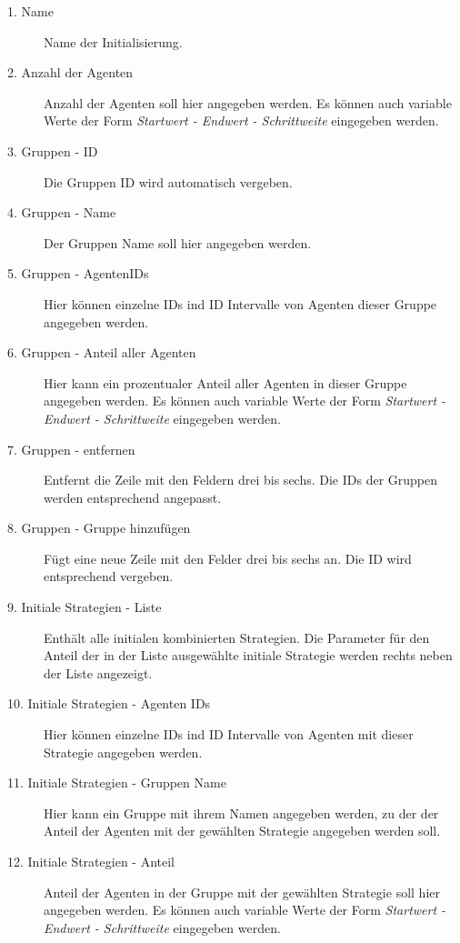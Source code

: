 \begin{description}


\item[1. Name] Name der Initialisierung.

\item[2. Anzahl der Agenten] Anzahl der Agenten soll hier angegeben werden. Es können auch variable Werte der Form \textit{Startwert - Endwert - Schrittweite} eingegeben werden.

\item[3. Gruppen - ID] Die Gruppen ID wird automatisch vergeben.

\item[4. Gruppen - Name] Der Gruppen Name soll hier angegeben werden.

\item[5. Gruppen - AgentenIDs] Hier können einzelne IDs ind ID Intervalle von Agenten dieser Gruppe angegeben werden. 

\item[6. Gruppen - Anteil aller Agenten] Hier kann ein prozentualer Anteil aller Agenten in dieser Gruppe angegeben werden. Es können auch variable Werte der Form \textit{Startwert - Endwert - Schrittweite} eingegeben werden.

\item[7. Gruppen - entfernen] Entfernt die Zeile mit den Feldern drei bis sechs. Die IDs der Gruppen werden entsprechend angepasst. 

\item[8. Gruppen - Gruppe hinzufügen] Fügt eine neue Zeile mit den Felder drei bis sechs an. Die ID wird entsprechend vergeben.

\item[9. Initiale Strategien - Liste] Enthält alle initialen kombinierten Strategien. Die Parameter für den Anteil der in der Liste ausgewählte initiale Strategie werden rechts neben der Liste angezeigt. 

\item[10. Initiale Strategien - Agenten IDs] Hier können einzelne IDs ind ID Intervalle von Agenten mit dieser Strategie angegeben werden. 

\item[11. Initiale Strategien - Gruppen Name] Hier kann ein Gruppe mit ihrem Namen angegeben werden, zu der der Anteil der Agenten mit der gewählten Strategie angegeben werden soll.

\item[12. Initiale Strategien - Anteil] Anteil der Agenten in der Gruppe mit der gewählten Strategie soll hier angegeben werden. Es können auch variable Werte der Form \textit{Startwert - Endwert - Schrittweite} eingegeben werden.


\end{description}
